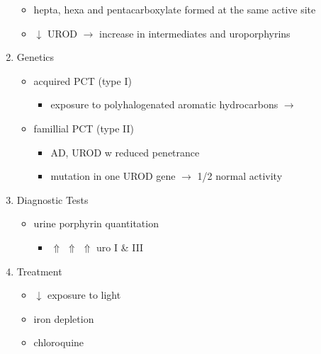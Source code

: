 \documentclass{scrartcl}
\begin{document}
\begin{enumerate}
\begin{itemize}
\item hepta, hexa and pentacarboxylate formed at the same active site
\item \(\downarrow\) UROD \(\to\) increase in intermediates and uroporphyrins
\end{itemize}
\item Genetics
\label{sec:org2c4bd69}
\begin{itemize}
\item acquired PCT (type I)
\begin{itemize}
\item exposure to polyhalogenated aromatic hydrocarbons \(\to\)
\end{itemize}
\item famillial PCT (type II)
\begin{itemize}
\item AD, UROD w reduced penetrance
\item mutation in one UROD gene \(\to\) 1/2 normal activity
\end{itemize}
\end{itemize}
\item Diagnostic Tests
\label{sec:orgaed7e9f}
\begin{itemize}
\item urine porphyrin quantitation
\begin{itemize}
\item \(\Uparrow\) \(\Uparrow\) \(\Uparrow\) uro I \& III
\end{itemize}
\end{itemize}
\item Treatment
\label{sec:org27e7dc7}
\begin{itemize}
\item \(\downarrow\) exposure to light
\item iron depletion
\item chloroquine
\end{itemize}
\end{enumerate}
\end{document}
